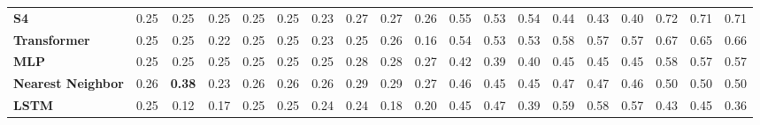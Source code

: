 \begin{table}[t]
{\begin{tabular}{l ccc ccc ccc ccc ccc ccc}
\textbf{S4} & \cellcolor[HTML]{FF6B6B}0.25 & \cellcolor[HTML]{FF6B6B}0.25 & \cellcolor[HTML]{FF6B6B}0.25 & \cellcolor[HTML]{FF6B6B}0.25 & \cellcolor[HTML]{FF6B6B}0.25 & \cellcolor[HTML]{FF6B6B}0.23 & \cellcolor[HTML]{FF7268}0.27 & \cellcolor[HTML]{FF7268}0.27 & \cellcolor[HTML]{FF6F69}0.26 & \cellcolor[HTML]{DBD344}0.55 & \cellcolor[HTML]{E7D341}0.53 & \cellcolor[HTML]{E3D342}0.54 & \cellcolor[HTML]{FFBC46}0.44 & \cellcolor[HTML]{FFB549}0.43 & \cellcolor[HTML]{FFAA4E}0.40 & \cellcolor[HTML]{68D060}0.72 & \cellcolor[HTML]{6BD060}0.71 & \cellcolor[HTML]{6BD060}0.71 \\
\textbf{Transformer} & \cellcolor[HTML]{FF6C6B}0.25 & \cellcolor[HTML]{FF6C6B}0.25 & \cellcolor[HTML]{FF6B6B}0.22 & \cellcolor[HTML]{FF6C6B}0.25 & \cellcolor[HTML]{FF6D6A}0.25 & \cellcolor[HTML]{FF6B6B}0.23 & \cellcolor[HTML]{FF6B6B}0.25 & \cellcolor[HTML]{FF6D6A}0.26 & \cellcolor[HTML]{FF6B6B}0.16 & \cellcolor[HTML]{E3D342}0.54 & \cellcolor[HTML]{E9D340}0.53 & \cellcolor[HTML]{EAD340}0.53 & \cellcolor[HTML]{C6D249}0.58 & \cellcolor[HTML]{CED347}0.57 & \cellcolor[HTML]{D0D347}0.57 & \cellcolor[HTML]{8CD157}0.67 & \cellcolor[HTML]{95D155}0.65 & \cellcolor[HTML]{91D156}0.66 \\
\textbf{MLP} & \cellcolor[HTML]{FF6B6B}0.25 & \cellcolor[HTML]{FF6B6B}0.25 & \cellcolor[HTML]{FF6B6B}0.25 & \cellcolor[HTML]{FF6B6B}0.25 & \cellcolor[HTML]{FF6B6B}0.25 & \cellcolor[HTML]{FF6B6B}0.25 & \cellcolor[HTML]{FF7965}0.28 & \cellcolor[HTML]{FF7965}0.28 & \cellcolor[HTML]{FF7268}0.27 & \cellcolor[HTML]{FFB34A}0.42 & \cellcolor[HTML]{FFA74F}0.39 & \cellcolor[HTML]{FFAB4E}0.40 & \cellcolor[HTML]{FFBF45}0.45 & \cellcolor[HTML]{FFBE45}0.45 & \cellcolor[HTML]{FFBE45}0.45 & \cellcolor[HTML]{C9D248}0.58 & \cellcolor[HTML]{CED347}0.57 & \cellcolor[HTML]{CCD348}0.57 \\
\textbf{Nearest Neighbor} & \cellcolor[HTML]{FF7168}0.26 & \cellcolor[HTML]{FFA252}\textbf{0.38} & \cellcolor[HTML]{FF6B6B}0.23 & \cellcolor[HTML]{FF7069}0.26 & \cellcolor[HTML]{FF7069}0.26 & \cellcolor[HTML]{FF7069}0.26 & \cellcolor[HTML]{FF7A64}0.29 & \cellcolor[HTML]{FF7A64}0.29 & \cellcolor[HTML]{FF7566}0.27 & \cellcolor[HTML]{FFC243}0.46 & \cellcolor[HTML]{FFBD45}0.45 & \cellcolor[HTML]{FFBE45}0.45 & \cellcolor[HTML]{FFC841}0.47 & \cellcolor[HTML]{FFC741}0.47 & \cellcolor[HTML]{FFC442}0.46 & \cellcolor[HTML]{FCD43C}0.50 & \cellcolor[HTML]{FFD33C}0.50 & \cellcolor[HTML]{FFD33B}0.50 \\
\textbf{LSTM} & \cellcolor[HTML]{FF6B6B}0.25 & \cellcolor[HTML]{FF6B6B}0.12 & \cellcolor[HTML]{FF6B6B}0.17 & \cellcolor[HTML]{FF6B6B}0.25 & \cellcolor[HTML]{FF6B6B}0.25 & \cellcolor[HTML]{FF6B6B}0.24 & \cellcolor[HTML]{FF6B6B}0.24 & \cellcolor[HTML]{FF6B6B}0.18 & \cellcolor[HTML]{FF6B6B}0.20 & \cellcolor[HTML]{FFC044}0.45 & \cellcolor[HTML]{FFC940}0.47 & \cellcolor[HTML]{FFA84F}0.39 & \cellcolor[HTML]{C3D24A}0.59 & \cellcolor[HTML]{C6D249}0.58 & \cellcolor[HTML]{CCD348}0.57 & \cellcolor[HTML]{FFB649}0.43 & \cellcolor[HTML]{FFC044}0.45 & \cellcolor[HTML]{FF9A55}0.36 \\

\end{tabular}}
\end{table}
